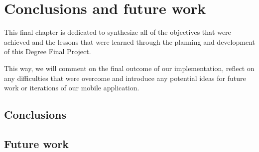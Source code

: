 \chapter{Conclusions and future work}
\label{chapter8}

This final chapter is dedicated to synthesize all of the objectives that were achieved and the lessons that were learned through the planning and development of this Degree Final Project.

This way, we will comment on the final outcome of our implementation, reflect on any difficulties that were overcome and introduce any potential ideas for future work or iterations of our mobile application.

\section{Conclusions}

\section{Future work}